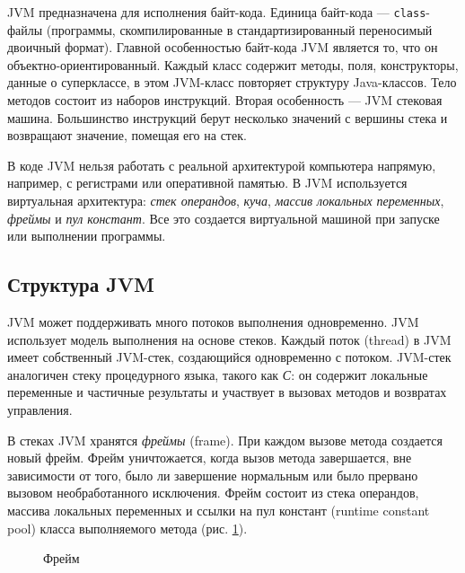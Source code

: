JVM предназначена для исполнения байт-кода. Единица байт-кода --- \texttt{class}-файлы (программы, скомпилированные в стандартизированный переносимый двоичный формат). Главной особенностью байт-кода JVM является то, что он объектно-ориентированный. Каждый класс содержит методы, поля, конструкторы, данные о суперклассе, в этом JVM-класс повторяет структуру Java-классов. Тело методов состоит из наборов инструкций. Вторая особенность --- JVM стековая машина. Большинство инструкций берут несколько значений с вершины стека и возвращают значение, помещая его на стек.

В коде JVM нельзя работать с реальной архитектурой компьютера напрямую, например, с регистрами или оперативной памятью. В JVM используется виртуальная архитектура: \textit{стек операндов}, \textit{куча}, \textit{массив локальных переменных}, \textit{фреймы} и \textit{пул констант}. Все это создается виртуальной машиной при запуске или выполнении программы.

\subsection{Структура JVM}
JVM может поддерживать много потоков выполнения одновременно. JVM использует модель выполнения на основе стеков. Каждый поток (thread) в JVM имеет собственный JVM-стек, создающийся одновременно с потоком. JVM-стек аналогичен стеку процедурного языка, такого как \textit{С}: он содержит локальные переменные и частичные результаты и участвует в вызовах методов и возвратах управления.  

В стеках JVM хранятся \textit{фреймы} (frame). При каждом вызове метода создается новый фрейм. Фрейм уничтожается, когда вызов метода завершается, вне зависимости от того, было ли завершение нормальным или было прервано вызовом необработанного исключения. Фрейм состоит из стека операндов, массива локальных переменных и ссылки на пул констант (runtime constant pool) класса выполняемого метода (рис. \ref{pic_Frame}). 

\begin{figure} [h]
\caption{Фрейм}\label{pic_Frame}
\end{figure}

